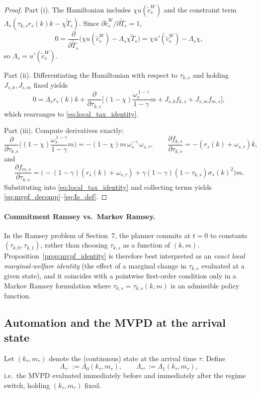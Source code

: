 \documentclass{article}
\begin{document}
\begin{proof}
Part (i). The Hamiltonian includes $\chi u(\widetilde c^W_s)$ and the constraint term $\Lambda_s(\tau_{k,s}r_s(k)k-\chi \widetilde T_s)$. Since $\partial \widetilde c^W_s/\partial \widetilde T_s = 1$,
\[
0=\frac{\partial}{\partial \widetilde T_s}\Big(\chi u(\widetilde c^W_s)-\Lambda_s\chi \widetilde T_s\Big)
=\chi u'(\widetilde c^W_s)-\Lambda_s\chi,
\]
so $\Lambda_s=u'(\widetilde c^W_s)$.

Part (ii). Differentiating the Hamiltonian with respect to $\tau_{k,s}$ and holding $J_{s,k},J_{s,m}$ fixed yields
\[
0 = \Lambda_s r_s(k)k + \frac{\partial}{\partial \tau_{k,s}}
\Bigg[
(1-\chi)\frac{\omega_s^{\,1-\gamma}}{1-\gamma}m + J_{s,k}f_{k,s}+J_{s,m}f_{m,s}
\Bigg],
\]
which rearranges to \eqref{eq:local_tax_identity}.

Part (iii). Compute derivatives exactly:
\[
\frac{\partial}{\partial \tau_{k,s}}\Big((1-\chi)\frac{\omega_s^{\,1-\gamma}}{1-\gamma}m\Big)
=-(1-\chi)m\,\omega_s^{-\gamma}\,\omega_{s,\tau},
\qquad
\frac{\partial f_{k,s}}{\partial \tau_{k,s}}
=-(r_s(k)+\omega_{s,\tau})k,
\]
and
\[
\frac{\partial f_{m,s}}{\partial \tau_{k,s}}
=
\Big(
-(1-\gamma)(r_s(k)+\omega_{s,\tau})
+\gamma(1-\gamma)(1-\tau_{k,s})\sigma_s(k)^2
\Big)m.
\]
Substituting into \eqref{eq:local_tax_identity} and collecting terms yields \eqref{eq:mvpf_decomp}--\eqref{eq:Is_def}.
\end{proof}

\paragraph{Commitment Ramsey vs.\ Markov Ramsey.}
In the Ramsey problem of Section~7, the planner commits at $t=0$ to constants $(\tau_{k,0},\tau_{k,1})$, rather than choosing $\tau_{k,s}$ as a function of $(k,m)$. Proposition~\ref{prop:mvpf_identity} is therefore best interpreted as an \emph{exact local marginal-welfare identity} (the effect of a marginal change in $\tau_{k,s}$ evaluated at a given state), and it coincides with a pointwise first-order condition only in a Markov Ramsey formulation where $\tau_{k,s}=\tau_{k,s}(k,m)$ is an admissible policy function.

\subsection{Automation and the MVPD at the arrival state}
\label{sec:mvpf_arrival}

Let $(k_\tau,m_\tau)$ denote the (continuous) state at the arrival time $\tau$. Define
\begin{equation}
\label{eq:mvpf_jump_defs}
\Lambda_{\tau^-} := \Lambda_0(k_\tau,m_\tau),
\qquad
\Lambda_{\tau^+} := \Lambda_1(k_\tau,m_\tau),
\end{equation}
i.e.\ the MVPD evaluated immediately before and immediately after the regime switch, holding $(k_\tau,m_\tau)$ fixed.
\end{document}
